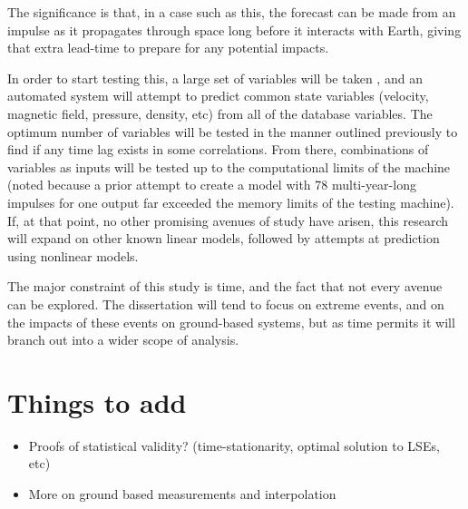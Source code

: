 \documentclass[10pt]{article}
\begin{document}
The significance is that, in a case such as this, the forecast can be made from an impulse as it propagates through space long before it interacts with Earth, giving that extra lead-time to prepare for any potential impacts. 

In order to start testing this, a large set of variables will be taken \citep{Denton}, and an automated system will attempt to predict common state variables (velocity, magnetic field, pressure, density, etc) from all of the database variables. The optimum number of variables will be tested in the manner outlined previously to find if any time lag exists in some correlations. From there, combinations of variables as inputs will be tested up to the computational limits of the machine (noted because a prior attempt to create a model with 78 multi-year-long impulses for one output far exceeded the memory limits of the testing machine). If, at that point, no other promising avenues of study have arisen, this research will expand on other known linear models, followed by attempts at prediction using nonlinear models.

The major constraint of this study is time, and the fact that not every avenue can be explored. The dissertation will tend to focus on extreme events, and on the impacts of these events on ground-based systems, but as time permits it will branch out into a wider scope of analysis.


\footnotesize





\section{Things to add}
\begin{itemize}
\item Proofs of statistical validity? (time-stationarity, optimal solution to LSEs, etc)
\item More on ground based measurements and interpolation

\end{itemize}
\end{document}
